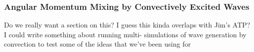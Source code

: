 {\color{purple}
\subsubsection{Angular Momentum Mixing by Convectively Excited Waves}}

Do we really want a section on this?  I guess this kinda overlaps with Jim's ATP?  I could write something about running multi- simulations of wave generation by convection to test some of the ideas that we've been using for 
